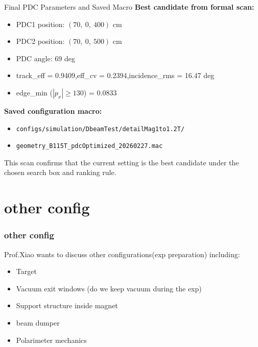 \documentclass[aspectratio=169]{beamer}
\begin{document}
\begin{frame}{Final PDC Parameters and Saved Macro}
    \textbf{Best candidate from formal scan:}
    \begin{itemize}
        \item PDC1 position: $(70,\ 0,\ 400)$ cm
        \item PDC2 position: $(70,\ 0,\ 500)$ cm
        \item PDC angle: $69$ deg
        \item track\_eff = 0.9409,\quad eff\_cv = 0.2394,\quad incidence\_rms = 16.47 deg
        \item edge\_min ($|p_x|\ge 130$) = 0.0833
    \end{itemize}
    \vspace{0.2cm}
    \textbf{Saved configuration macro:}
    \begin{itemize}
        \item \texttt{configs/simulation/DbeamTest/detailMag1to1.2T/}
        \item \texttt{geometry\_B115T\_pdcOptimized\_20260227.mac}
    \end{itemize}
    \vspace{0.2cm}
    This scan confirms that the current setting is the best candidate under the chosen search box and ranking rule.
\end{frame}

\section{other config}

\begin{frame}
    \tableofcontents[currentsection]
\end{frame}

\begin{frame}
    \frametitle{other config}
   Prof.Xiao wants to discuss other configurations(exp preparation) including: 
    \begin{itemize}
        \item Target 
        \item Vacuum exit windows (do we keep vacuum during the exp)
        \item Support structure inside magnet
        \item beam dumper
        \item Polarimeter mechanics
    \end{itemize}
\end{frame}
\end{document}
